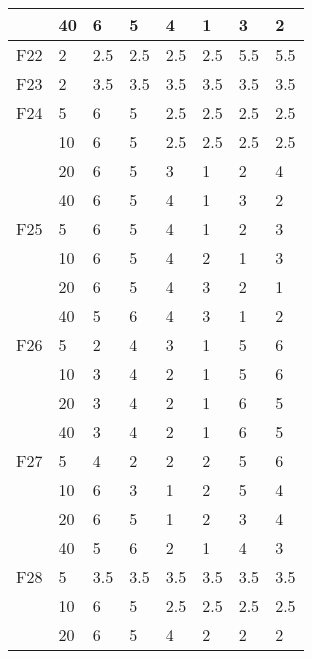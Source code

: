 \begin{longtable}{|l|l|l|l|l|l|l|l|}
            & 40  & 6   & 5    & 4    & 1   & 3       & 2       \\ \midrule
F22      & 2   & 2.5 & 2.5  & 2.5  & 2.5 & 5.5     & 5.5     \\ \midrule
F23      & 2   & 3.5 & 3.5  & 3.5  & 3.5 & 3.5     & 3.5     \\ \midrule
F24      & 5   & 6   & 5    & 2.5  & 2.5 & 2.5     & 2.5     \\ \cmidrule{2-8}
            & 10  & 6   & 5    & 2.5  & 2.5 & 2.5     & 2.5     \\ \cmidrule{2-8}
            & 20  & 6   & 5    & 3    & 1   & 2       & 4       \\ \cmidrule{2-8}
            & 40  & 6   & 5    & 4    & 1   & 3       & 2       \\ \midrule
F25      & 5   & 6   & 5    & 4    & 1   & 2       & 3       \\ \cmidrule{2-8}
            & 10  & 6   & 5    & 4    & 2   & 1       & 3       \\ \cmidrule{2-8}
            & 20  & 6   & 5    & 4    & 3   & 2       & 1       \\ \cmidrule{2-8}
            & 40  & 5   & 6    & 4    & 3   & 1       & 2       \\ \midrule
F26      & 5   & 2   & 4    & 3    & 1   & 5       & 6       \\ \cmidrule{2-8}
            & 10  & 3   & 4    & 2    & 1   & 5       & 6       \\ \cmidrule{2-8}
            & 20  & 3   & 4    & 2    & 1   & 6       & 5       \\ \cmidrule{2-8}
            & 40  & 3   & 4    & 2    & 1   & 6       & 5       \\ \midrule
F27      & 5   & 4   & 2    & 2    & 2   & 5       & 6       \\ \cmidrule{2-8}
            & 10  & 6   & 3    & 1    & 2   & 5       & 4       \\ \cmidrule{2-8}
            & 20  & 6   & 5    & 1    & 2   & 3       & 4       \\ \cmidrule{2-8}
            & 40  & 5   & 6    & 2    & 1   & 4       & 3       \\ \midrule
F28      & 5   & 3.5 & 3.5  & 3.5  & 3.5 & 3.5     & 3.5     \\ \cmidrule{2-8}
            & 10  & 6   & 5    & 2.5  & 2.5 & 2.5     & 2.5     \\ \cmidrule{2-8}
            & 20  & 6   & 5    & 4    & 2   & 2       & 2       \\ \cmidrule{2-8}

\end{longtable}
